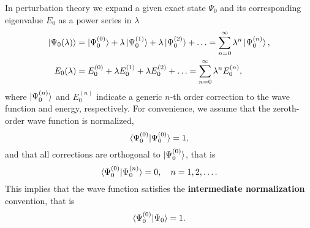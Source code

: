 \documentclass[../Main/chem532-notes.tex]{subfiles}
\begin{document}
In perturbation theory we expand a given exact state $\Psi_0$ and its corresponding eigenvalue $E_0$ as a power series in $\lambda$
\begin{align}
\ket{\Psi_0(\lambda)} &= \ket{\Psi_0^{(0)}}
+ \lambda \ket{\Psi_0^{(1)}} + \lambda \ket{\Psi_0^{(2)}} + \ldots = \sum_{n = 0}^\infty \lambda^n \ket{\Psi_0^{(n)}} , \\
E_0(\lambda) &= E_0^{(0)}
+ \lambda E_0^{(1)} + \lambda E_0^{(2)} + \ldots = \sum_{n = 0}^\infty \lambda^n E_0^{(n)},
\end{align}
where $\ket{\Psi_0^{(n)}}$ and $E_0^{(n)}$ indicate a generic $n$-th order correction to the wave function and energy, respectively.
For convenience, we assume that the zeroth-order wave function is normalized,
\begin{equation}
\braket{\Psi_0^{(0)}|\Psi_0^{(0)}} = 1,
\end{equation}
and that all corrections are orthogonal to $\ket{\Psi_0^{(0)}}$, that is
 \begin{equation}
\braket{\Psi_0^{(0)}|\Psi_0^{(n)}} = 0, \quad n = 1, 2, \ldots.
\end{equation}
This implies that the wave function satisfies the \textbf{intermediate normalization} convention, that is 
\begin{equation}
\braket{\Psi_0^{(0)}|\Psi_0} = 1.
\end{equation}
\end{document}
